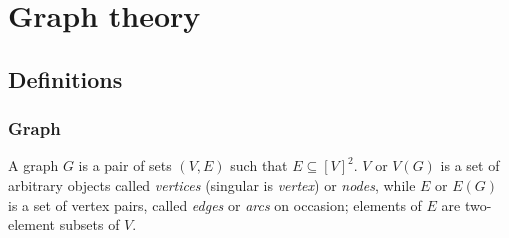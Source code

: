 \chapter{Graph theory}

  \section{Definitions}
        
    \subsection{Graph}

      A graph $G$ is a pair of sets $(V, E)$ such that $E \subseteq [V]^2$. $V$ or $V(G)$ is a set of arbitrary objects called \emph{vertices} (singular is \emph{vertex}) or \emph{nodes}, while $E$ or $E(G)$ is a set of vertex pairs, called \emph{edges} or \emph{arcs} on occasion; elements of $E$ are two-element subsets of $V$\cite{Diestel2012}.
      
